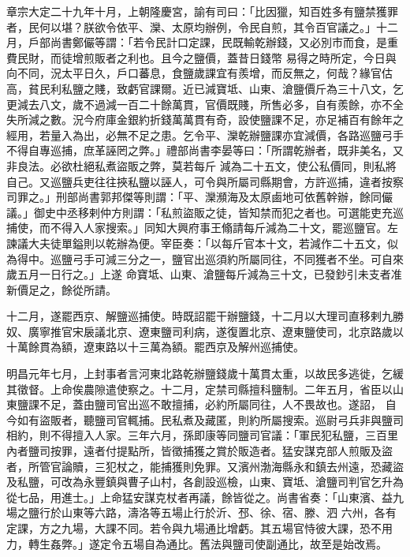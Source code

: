 \begin{pinyinscope}
 章宗大定二十九年十月，上朝隆慶宮，諭有司曰：「比因獵，知百姓多有鹽禁獲罪者，民何以堪？朕欲令依平、灤、太原均辦例，令民自煎，其令百官議之。」十二月，戶部尚書鄭儼等謂：「若令民計口定課，民既輸乾辦錢，又必別市而食，是重費民財，而徒增煎販者之利也。且今之鹽價，蓋昔日錢幣
 易得之時所定，今日與向不同，況太平日久，戶口蕃息，食鹽歲課宜有羨增，而反無之，何哉？緣官估高，貧民利私鹽之賤，致虧官課爾。近已減寶坻、山東、滄鹽價斤為三十八文，乞更減去八文，歲不過減一百二十餘萬貫，官價既賤，所售必多，自有羨餘，亦不全失所減之數。況今府庫金銀約折錢萬萬貫有奇，設使鹽課不足，亦足補百有餘年之經用，若量入為出，必無不足之患。乞令平、灤乾辦鹽課亦宜減價，各路巡鹽弓手不得自專巡捕，庶革誣罔之弊。」禮部尚書李晏等曰：「所謂乾辦者，既非美名，又非良法。必欲杜絕私煮盜販之弊，莫若每斤
 減為二十五文，使公私價同，則私將自己。又巡鹽兵吏往往挾私鹽以誣人，可令與所屬司縣期會，方許巡捕，違者按察司罪之。」刑部尚書郭邦傑等則謂：「平、灤瀕海及太原鹵地可依舊幹辦，餘同儼議。」御史中丞移剌仲方則謂：「私煎盜販之徒，皆知禁而犯之者也。可選能吏充巡捕使，而不得入人家搜索。」同知大興府事王翛請每斤減為二十文，罷巡鹽官。左諫議大夫徒單鎰則以乾辦為便。宰臣奏：「以每斤官本十文，若減作二十五文，似為得中。巡鹽弓手可減三分之一，鹽官出巡須約所屬同往，不同獲者不坐。可自來歲五月一日行之。」上遂
 命寶坻、山東、滄鹽每斤減為三十文，已發鈔引未支者准新價足之，餘從所請。



 十二月，遂罷西京、解鹽巡捕使。時既詔罷干辦鹽錢，十二月以大理司直移剌九勝奴、廣寧推官宋扆議北京、遼東鹽司利病，遂復置北京、遼東鹽使司，北京路歲以十萬餘貫為額，遼東路以十三萬為額。罷西京及解州巡捕使。



 明昌元年七月，上封事者言河東北路乾辦鹽錢歲十萬貫太重，以故民多逃徙，乞緩其徵督。上命俟農隙遣使察之。十二月，定禁司縣擅科鹽制。二年五月，省臣以山東鹽課不足，蓋由鹽司官出巡不敢擅捕，必約所屬同往，人不畏故也。遂詔，
 自今如有盜販者，聽鹽司官輒捕。民私煮及藏匿，則約所屬搜索。巡尉弓兵非與鹽司相約，則不得擅入人家。三年六月，孫即康等同鹽司官議：「軍民犯私鹽，三百里內者鹽司按罪，遠者付提點所，皆徵捕獲之賞於販造者。猛安謀克部人煎販及盜者，所管官論贖，三犯杖之，能捕獲則免罪。又濱州渤海縣永和鎮去州遠，恐藏盜及私鹽，可改為永豐鎮與曹子山村，各創設巡檢，山東、寶坻、滄鹽司判官乞升為從七品，用進士。」上命猛安謀克杖者再議，餘皆從之。尚書省奏：「山東濱、益九場之鹽行於山東等六路，濤洛等五場止行於沂、邳、徐、宿、滕、泗
 六州，各有定課，方之九場，大課不同。若令與九場通比增虧。其五場官恃彼大課，恐不用力，轉生姦弊。」遂定令五場自為通比。舊法與鹽司使副通比，故至是始改焉。




\end{pinyinscope}
